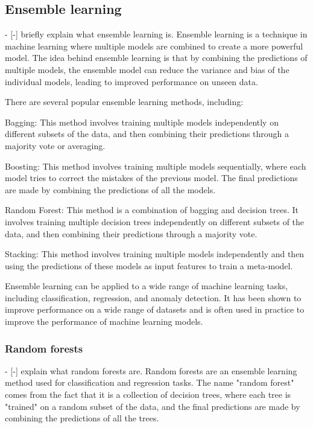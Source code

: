 \subsection{Ensemble learning}
- [-] briefly explain what ensemble learning is.
Ensemble learning is a technique in machine learning where multiple models are combined to create a more powerful model. The idea behind ensemble learning is that by combining the predictions of multiple models, the ensemble model can reduce the variance and bias of the individual models, leading to improved performance on unseen data.

There are several popular ensemble learning methods, including:

Bagging: This method involves training multiple models independently on different subsets of the data, and then combining their predictions through a majority vote or averaging.

Boosting: This method involves training multiple models sequentially, where each model tries to correct the mistakes of the previous model. The final predictions are made by combining the predictions of all the models.

Random Forest: This method is a combination of bagging and decision trees. It involves training multiple decision trees independently on different subsets of the data, and then combining their predictions through a majority vote.

Stacking: This method involves training multiple models independently and then using the predictions of these models as input features to train a meta-model.

Ensemble learning can be applied to a wide range of machine learning tasks, including classification, regression, and anomaly detection. It has been shown to improve performance on a wide range of datasets and is often used in practice to improve the performance of machine learning models.


\subsubsection{Random forests}
- [-] explain what random forests are.
Random forests are an ensemble learning method used for classification and regression tasks. The name "random forest" comes from the fact that it is a collection of decision trees, where each tree is "trained" on a random subset of the data, and the final predictions are made by combining the predictions of all the trees.

